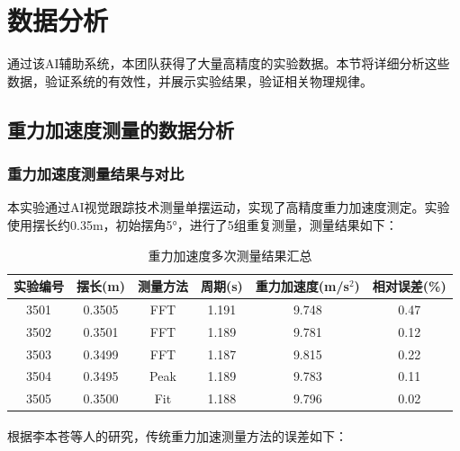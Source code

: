 \section{数据分析}

通过该AI辅助系统，本团队获得了大量高精度的实验数据。本节将详细分析这些数据，验证系统的有效性，并展示实验结果，验证相关物理规律。


\subsection{重力加速度测量的数据分析}


\subsubsection{重力加速度测量结果与对比}
本实验通过AI视觉跟踪技术测量单摆运动，实现了高精度重力加速度测定。实验使用摆长约0.35m，初始摆角5°，进行了5组重复测量，测量结果如下：

\begin{table}[H]
\centering
\caption{重力加速度多次测量结果汇总}
\begin{tabular}{@{}c c c c c c@{}}
\toprule
\textbf{实验编号} & \textbf{摆长(m)} & \textbf{测量方法} & \textbf{周期(s)} & \textbf{重力加速度(m/s$^2$)} & \textbf{相对误差(\%)} \\
\midrule
3501 & 0.3505 & FFT & 1.191 & 9.748 & 0.47 \\
3502 & 0.3501 & FFT & 1.189 & 9.781 & 0.12 \\
3503 & 0.3499 & FFT & 1.187 & 9.815 & 0.22 \\
3504 & 0.3495 & Peak & 1.189 & 9.783 & 0.11 \\
3505 & 0.3500 & Fit & 1.188 & 9.796 & 0.02 \\
\bottomrule
\end{tabular}
\label{tab:gravity_results}
\end{table}


根据李本苍等人的研究\textsuperscript{\cite{KJSJ201335139}}，传统重力加速测量方法的误差如下：

